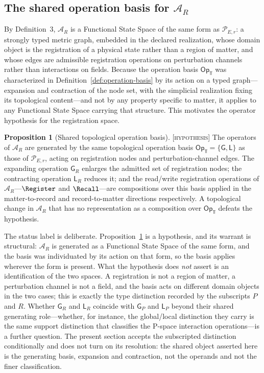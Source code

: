 \documentclass[10pt,twoside,a5paper]{article}
\theoremstyle{definition}
\newtheorem{claimprop}{Proposition}
\begin{document}
\subsection{The shared operation basis for \texorpdfstring{$\mathcal{A}_{R}$}{A(R)-space}}
\label{subsec:shared-basis}

By Definition~3, $\mathcal{A}_{R}$ is a Functional State Space of the same form as
$\mathcal{P}_{E,r}$: a strongly typed metric graph, embedded in the declared
realization, whose domain object is the registration of a physical state rather than a
region of matter, and whose edges are admissible registration operations on
perturbation channels rather than interactions on fields. Because the operation basis
$\mathsf{Op}_{\Top}$ was characterized in Definition~\ref{def:operation-basis} by its
action on a typed graph---expansion and contraction of the node set, with the
simplicial realization fixing its topological content---and not by any property
specific to matter, it applies to any Functional State Space carrying that structure.
This motivates the operator hypothesis for the registration space.

\begin{claimprop}[Shared topological operation basis]
\label{prop:shared-basis}
\textsc{[hypothesis]} The operators of $\mathcal{A}_{R}$ are generated by the same
topological operation basis $\mathsf{Op}_{\Top}=\{\mathsf{G},\mathsf{L}\}$ as those of
$\mathcal{P}_{E,r}$, acting on registration nodes and perturbation-channel edges. The
expanding operation $\mathsf{G}_{R}$ enlarges the admitted set of registration nodes;
the contracting operation $\mathsf{L}_{R}$ reduces it; and the read/write registration
operations of $\mathcal{A}_{R}$---$\Register$ and $\Recall$---are compositions over
this basis applied in the matter-to-record and record-to-matter directions
respectively. A topological change in $\mathcal{A}_{R}$ that has no representation as a
composition over $\mathsf{Op}_{\Top}$ defeats the hypothesis.
\end{claimprop}

The status label is deliberate. Proposition~\ref{prop:shared-basis} is a hypothesis,
and its warrant is structural: $\mathcal{A}_{R}$ is generated as a Functional State
Space of the same form, and the basis was individuated by its action on that form, so
the basis applies wherever the form is present. What the hypothesis does \emph{not}
assert is an identification of the two spaces. A registration is not a region of
matter, a perturbation channel is not a field, and the basis acts on different domain
objects in the two cases; this is exactly the type distinction recorded by the
subscripts $P$ and $R$. Whether $\mathsf{G}_{R}$ and $\mathsf{L}_{R}$ coincide with
$\mathsf{G}_{P}$ and $\mathsf{L}_{P}$ beyond their shared generating role---whether,
for instance, the global/local distinction they carry is the same support distinction
that classifies the P-space interaction operations---is a further question. The
present section accepts the subscripted distinction conditionally and does not turn on
its resolution: the shared object asserted here is the generating basis, expansion and
contraction, not the operands and not the finer classification.
\end{document}
